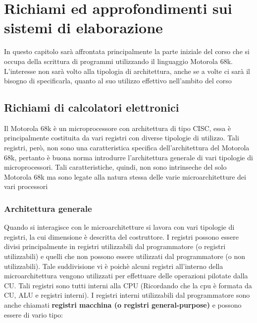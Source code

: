 \chapter{Richiami ed approfondimenti sui sistemi di
elaborazione}
In questo capitolo sarà affrontata principalmente la parte iniziale del corso che si occupa della scrittura di programmi utilizzando il linguaggio Motorola 68k. L'interesse non sarà volto alla tipologia di architettura, anche se a volte ci sarà il bisogno di specificarla, quanto al suo utilizzo effettivo nell'ambito del corso

\section{Richiami di calcolatori elettronici}
Il Motorola 68k è un microprocessore con architettura di tipo CISC, essa è principalmente costituita da vari registri con diverse tipologie di utilizzo. Tali registri, però, non sono una caratteristica specifica dell'architettura del Motorola 68k, pertanto è buona norma introdurre l'architettura generale di vari tipologie di microprocessori. Tali caratteristiche, quindi, non sono intrinseche del solo Motorola 68k ma sono legate alla natura stessa delle varie microarchitetture dei vari processori

\subsection{Architettura generale}
Quando si interagisce con le microarchitetture si lavora con vari tipologie di registri, la cui dimensione è descritta del costruttore.
I registri possono essere divisi principalmente in registri utilizzabili dal programmatore (o registri utilizzabili) e quelli che non possono essere utilizzati dal programmatore (o non utilizzabili). Tale suddivisione vi è poichè alcuni registri all'interno della microarchitettura vengono utilizzati per effettuare delle operazioni pilotate dalla CU. Tali registri sono tutti interni alla CPU (Ricordando che la cpu è formata da CU, ALU e registri interni). I registri interni utilizzabili dal programmatore sono anche chiamati \textbf{registri macchina (o registri general-purpose)} e possono essere di vario tipo:

